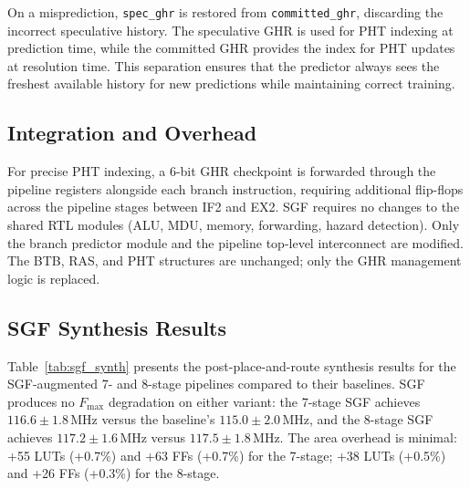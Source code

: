 \documentclass[journal]{IEEEtran}
\begin{document}
\begin{table}[t]
\begin{table}[t]
\begin{table}[t]
\begin{table}[t]
\begin{table}[t]
\begin{table}[t]
On a misprediction, \texttt{spec\_ghr} is restored from \texttt{committed\_ghr}, discarding the incorrect speculative history. The speculative GHR is used for PHT indexing at prediction time, while the committed GHR provides the index for PHT updates at resolution time. This separation ensures that the predictor always sees the freshest available history for new predictions while maintaining correct training.

\subsection{Integration and Overhead}

For precise PHT indexing, a 6-bit GHR checkpoint is forwarded through the pipeline registers alongside each branch instruction, requiring additional flip-flops across the pipeline stages between IF2 and EX2. SGF requires no changes to the shared RTL modules (ALU, MDU, memory, forwarding, hazard detection). Only the branch predictor module and the pipeline top-level interconnect are modified. The BTB, RAS, and PHT structures are unchanged; only the GHR management logic is replaced.

\subsection{SGF Synthesis Results}

Table~\ref{tab:sgf_synth} presents the post-place-and-route synthesis results for the SGF-augmented 7- and 8-stage pipelines compared to their baselines. SGF produces no $F_{\max}$ degradation on either variant: the 7-stage SGF achieves $116.6 \pm 1.8$\,MHz versus the baseline's $115.0 \pm 2.0$\,MHz, and the 8-stage SGF achieves $117.2 \pm 1.6$\,MHz versus $117.5 \pm 1.8$\,MHz. The area overhead is minimal: +55 LUTs (+0.7\%) and +63 FFs (+0.7\%) for the 7-stage; +38 LUTs (+0.5\%) and +26 FFs (+0.3\%) for the 8-stage.


\end{table}
\end{table}
\end{table}
\end{table}
\end{table}
\end{table}
\end{document}
